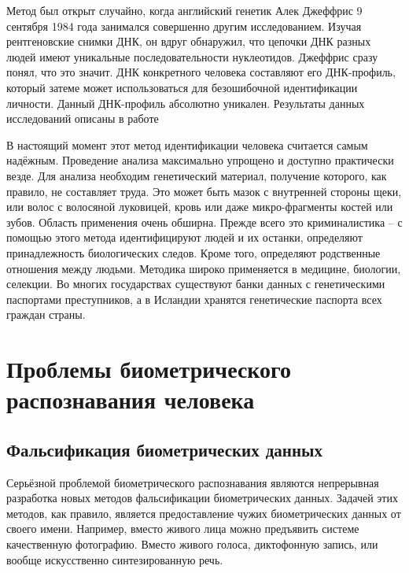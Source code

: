 \documentclass[14pt, a4paper]{extarticle}
\begin{document}

Метод был открыт случайно, когда английский генетик Алек Джеффрис 9 сентября 1984 года занимался совершенно другим исследованием. Изучая рентгеновские снимки ДНК, он вдруг обнаружил, что цепочки ДНК разных людей имеют уникальные последовательности нуклеотидов. Джеффрис сразу понял, что это значит. ДНК конкретного человека составляют его ДНК-профиль, который затеме может использоваться для безошибочной идентификации личности. Данный ДНК-профиль абсолютно уникален. Результаты данных исследований описаны в работе \cite{gill1985forensic}

В настоящий момент этот метод идентификации человека считается самым надёжным. Проведение анализа максимально упрощено и доступно практически везде. Для анализа необходим генетический материал, получение которого, как правило, не составляет труда. Это может быть мазок с внутренней стороны щеки, или волос с волосяной луковицей, кровь или даже микро-фрагменты костей или зубов. Область применения очень обширна. Прежде всего это криминалистика – с помощью этого метода идентифицируют людей и их останки, определяют принадлежность биологических следов. Кроме того, определяют родственные отношения между людьми. Методика широко применяется в медицине, биологии, селекции. Во многих государствах существуют банки данных с генетическими паспортами преступников, а в Исландии хранятся генетические паспорта всех граждан страны.

\newpage
\section{Проблемы биометрического распознавания человека}

\subsection{Фальсификация биометрических данных}
Серьёзной проблемой биометрического распознавания являются непрерывная разработка новых методов фальсификации биометрических данных. Задачей этих методов, как правило, является предоставление чужих биометрических данных от своего имени. Например, вместо живого лица можно предъявить системе качественную фотографию. Вместо живого голоса, диктофонную запись, или вообще искусственно синтезированную речь.
\end{document}
